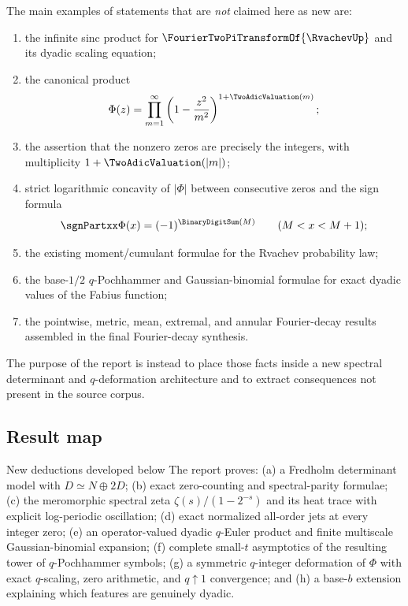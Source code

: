 \documentclass[11pt]{article}
\numberwithin{equation}{section}
\theoremstyle{definition}
\theoremstyle{remark}
\begin{document}
The main examples of statements that are \emph{not} claimed here as new are:
\begin{enumerate}[label=(\roman*),leftmargin=2.1em]
\item the infinite sinc product for $\FourierTwoPiTransformOf{\RvachevUp}$ and its dyadic scaling equation;
\item the canonical product
\[
 \Phi(z)=\prod_{m=1}^{\infty}\left(1-\frac{z^2}{m^2}\right)^{1+\TwoAdicValuation(m)};
\]
\item the assertion that the nonzero zeros are precisely the integers, with multiplicity $1+\TwoAdicValuation(|m|)$;
\item strict logarithmic concavity of $|\Phi|$ between consecutive zeros and the sign formula
\[
 \sgnPartxx\Phi(x)=(-1)^{\BinaryDigitSum(M)}\qquad(M<x<M+1);
\]
\item the existing moment/cumulant formulae for the Rvachev probability law;
\item the base-$1/2$ $q$-Pochhammer and Gaussian-binomial formulae for exact dyadic values of the Fabius function;
\item the pointwise, metric, mean, extremal, and annular Fourier-decay results assembled in the final Fourier-decay synthesis.
\end{enumerate}

The purpose of the report is instead to place those facts inside a new spectral determinant and $q$-deformation architecture and to extract consequences not present in the source corpus.

\subsection{Result map}

\begin{resultboxPartxx}{New deductions developed below}
The report proves: (a) a Fredholm determinant model with $D\simeq N\oplus2D$; (b) exact zero-counting and spectral-parity formulae; (c) the meromorphic spectral zeta $\zeta(s)/(1-2^{-s})$ and its heat trace with explicit log-periodic oscillation; (d) exact normalized all-order jets at every integer zero; (e) an operator-valued dyadic $q$-Euler product and finite multiscale Gaussian-binomial expansion; (f) complete small-$t$ asymptotics of the resulting tower of $q$-Pochhammer symbols; (g) a symmetric $q$-integer deformation of $\Phi$ with exact $q$-scaling, zero arithmetic, and $q\uparrow1$ convergence; and (h) a base-$b$ extension explaining which features are genuinely dyadic.
\end{resultboxPartxx}
\end{document}
